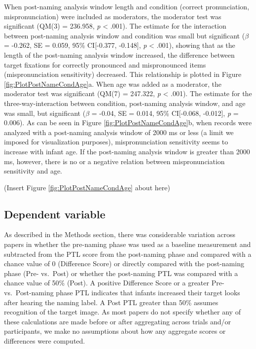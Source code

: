 \documentclass[man, noextraspace]{apa6}
\begin{document}
When post-naming analysis window length and condition (correct pronunciation, mispronunciation) were included as moderators, the moderator test was significant (QM(3) = 236.958, \emph{p} \textless{} .001). The estimate for the interaction between post-naming analysis window and condition was small but significant (\(\beta\) = -0.262, SE = 0.059, 95\% CI{[}-0.377, -0.148{]}, \emph{p} \textless{} .001), showing that as the length of the post-naming analysis window increased, the difference between target fixations for correctly pronounced and mispronounced items (mispronunciation sensitivity) decreased. This relationship is plotted in Figure \ref{fig:PlotPostNameCondAge}a. When age was added as a moderator, the moderator test was significant (QM(7) = 247.322, \emph{p} \textless{} .001). The estimate for the three-way-interaction between condition, post-naming analysis window, and age was small, but significant (\(\beta\) = -0.04, SE = 0.014, 95\% CI{[}-0.068, -0.012{]}, \emph{p} = 0.006). As can be seen in Figure \ref{fig:PlotPostNameCondAge}b, when records were analyzed with a post-naming analysis window of 2000 ms or less (a limit we imposed for visualization purposes), mispronunciation sensitivity seems to increase with infant age. If the post-naming analysis window is greater than 2000 ms, however, there is no or a negative relation between mispronunciation sensitivity and age.

(Insert Figure \ref{fig:PlotPostNameCondAge} about here)

\hypertarget{dependent-variable}{%
\subsection{Dependent variable}\label{dependent-variable}}

As described in the Methods section, there was considerable variation across papers in whether the pre-naming phase was used as a baseline measurement and subtracted from the PTL score from the post-naming phase and compared with a chance value of 0 (Difference Score) or directly compared with the post-naming phase (Pre- vs.~Post) or whether the post-naming PTL was compared with a chance value of 50\% (Post). A positive Difference Score or a greater Pre- vs.~Post-naming phase PTL indicates that infants increased their target looks after hearing the naming label. A Post PTL greater than 50\% assumes recognition of the target image. As most papers do not specify whether any of these calculations are made before or after aggregating across trials and/or participants, we make no assumptions about how any aggregate scores or differences were computed.
\end{document}
